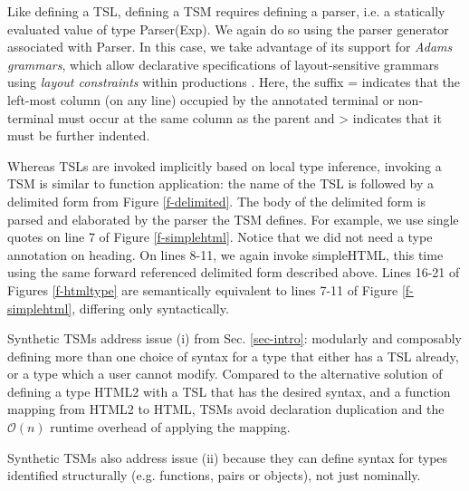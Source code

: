 \documentclass{sig-alternate}[10pt]
\makeatletter
\newcommand\BeraMonottfamily{%
  \def\fvm@Scale{0.85}%
  \fontfamily{fvm}\selectfont%
}
\newcommand{\lstinlinew}[1]{{\scriptsize\BeraMonottfamily #1}}
\makeatother
\begin{document}
Like defining a TSL, defining a TSM requires defining a parser, i.e. a statically evaluated value of type \lstinlinew{Parser(Exp)}. We again do so using the parser generator associated with \lstinlinew{Parser}. In this case, we take advantage of its support for \emph{Adams grammars}, which allow declarative specifications of layout-sensitive grammars using \emph{layout constraints} within productions \cite{Adams:2013:PPI:2429069.2429129}. Here, the suffix \lstinlinew{=} indicates that the left-most column (on any line) occupied by the annotated terminal or non-terminal must occur at the same column as the parent  and \lstinlinew{>} indicates that it must be further indented. %

Whereas TSLs are invoked implicitly based on local type inference, invoking a TSM is similar to function application: the name of the TSL is followed by a delimited form from Figure \ref{f-delimited}. The body of the delimited form is parsed and elaborated by the parser the TSM defines. %
For example, we use single quotes on line 7 of Figure \ref{f-simplehtml}. Notice that we did not need a type annotation on \lstinlinew{heading}. %
 On lines 8-11, we again invoke \lstinlinew{simpleHTML}, this time using the same forward referenced delimited form described above. Lines 16-21 of Figures \ref{f-htmltype} are semantically equivalent to lines 7-11 of Figure \ref{f-simplehtml}, differing only syntactically.

 Synthetic TSMs address issue (i) from Sec. \ref{sec-intro}: modularly and composably defining more than one choice of syntax for a type that either has a TSL  already, or a type which a user cannot modify. Compared to the alternative solution of defining a type \lstinlinew{HTML2} with a TSL that has the desired syntax, and a function mapping from \lstinlinew{HTML2} to \lstinlinew{HTML},  TSMs avoid declaration duplication and  the $\mathcal{O}(n)$ runtime overhead of applying the mapping. %

Synthetic TSMs also address issue (ii) because they can define syntax for types identified structurally (e.g. functions, pairs or objects), not just nominally.

\end{document}
